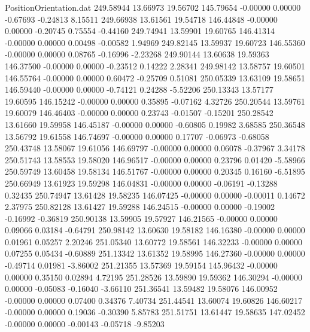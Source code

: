 \begin{filecontents}{PositionOrientation.dat}
 249.58944   13.66973   19.56702   145.79654   -0.00000    0.00000   -0.67693   -0.24813    8.15511
 249.66938   13.61561   19.54718   146.44848   -0.00000    0.00000   -0.20745    0.75554   -0.44160
 249.74941   13.59901   19.60765   146.41314   -0.00000    0.00000    0.00498   -0.00582    1.94969
 249.82145   13.59937   19.60723   146.55360   -0.00000    0.00000    0.08765   -0.16996   -2.23268
 249.90144   13.60638   19.59363   146.37500   -0.00000    0.00000   -0.23512    0.14222    2.28341
 249.98142   13.58757   19.60501   146.55764   -0.00000    0.00000    0.60472   -0.25709    0.51081
 250.05339   13.63109   19.58651   146.59440   -0.00000    0.00000   -0.74121    0.24288   -5.52206
 250.13343   13.57177   19.60595   146.15242   -0.00000    0.00000    0.35895   -0.07162    4.32726
 250.20544   13.59761   19.60079   146.46403   -0.00000    0.00000    0.23743   -0.01507   -0.15201
 250.28542   13.61660   19.59958   146.45187   -0.00000    0.00000   -0.60805    0.19982    3.68585
 250.36548   13.56792   19.61558   146.74697   -0.00000    0.00000    0.17707   -0.06973   -0.68058
 250.43748   13.58067   19.61056   146.69797   -0.00000    0.00000    0.06078   -0.37967    3.34178
 250.51743   13.58553   19.58020   146.96517   -0.00000    0.00000    0.23796    0.01420   -5.58966
 250.59749   13.60458   19.58134   146.51767   -0.00000    0.00000    0.20345    0.16160   -6.51895
 250.66949   13.61923   19.59298   146.04831   -0.00000    0.00000   -0.06191   -0.13288    0.32435
 250.74947   13.61428   19.58235   146.07425   -0.00000    0.00000   -0.00011    0.14672    2.37975
 250.82128   13.61427   19.59288   146.24515   -0.00000    0.00000   -0.19002   -0.16992   -0.36819
 250.90138   13.59905   19.57927   146.21565   -0.00000    0.00000    0.09066    0.03184   -0.64791
 250.98142   13.60630   19.58182   146.16380   -0.00000    0.00000    0.01961    0.05257    2.20246
 251.05340   13.60772   19.58561   146.32233   -0.00000    0.00000    0.07255    0.05434   -0.60889
 251.13342   13.61352   19.58995   146.27360   -0.00000    0.00000   -0.49714    0.01981   -3.86002
 251.21355   13.57369   19.59154   145.96432   -0.00000    0.00000    0.35150    0.02894    4.72195
 251.28526   13.59890   19.59362   146.30294   -0.00000    0.00000   -0.05083   -0.16040   -3.66110
 251.36541   13.59482   19.58076   146.00952   -0.00000    0.00000    0.07400    0.34376    7.40734
 251.44541   13.60074   19.60826   146.60217   -0.00000    0.00000    0.19036   -0.30390    5.85783
 251.51751   13.61447   19.58635   147.02452   -0.00000    0.00000   -0.00143   -0.05718   -9.85203

\end{filecontents}
